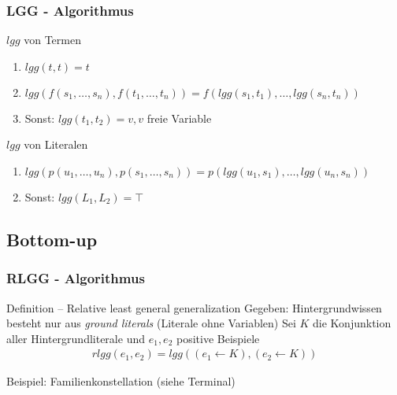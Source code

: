 \begin{frame}
\frametitle{LGG - Algorithmus}
	\begin{block}{$lgg$ von Termen}
		\begin{enumerate}
			\item $lgg(t,t) = t$\\
			\item $lgg(f(s_1, \ldots, s_n), f(t_1, \ldots, t_n)) = f(lgg(s_1, t_1), \ldots, lgg(s_n, t_n))$
			\item Sonst: $lgg(t_1, t_2) = v , v$ freie Variable
		\end{enumerate}
	\end{block}
	\begin{block}{$lgg$ von Literalen}
	\begin{enumerate}
		\item $lgg(p(u_1, \ldots, u_n), p(s_1, \ldots, s_n)) = p(lgg(u_1, s_1), \ldots, lgg(u_n, s_n))$\\
		\item Sonst: $lgg(L_1, L_2) = \top$
	\end{enumerate}
	\end{block}
\end{frame}


\subsection{Bottom-up}
\begin{frame}
\frametitle{RLGG - Algorithmus}
\begin{block}{Definition -- Relative least general generalization}
	Gegeben: Hintergrundwissen besteht nur aus \textit{ground literals} (Literale ohne Variablen)
	Sei $K$ die Konjunktion aller Hintergrundliterale und $e_1, e_2$ positive Beispiele
	\begin{align*}
		rlgg(e_1, e_2) = lgg((e_1 \leftarrow K), (e_2 \leftarrow K))
	\end{align*}
\end{block}

Beispiel: Familienkonstellation (siehe Terminal)
\end{frame}


